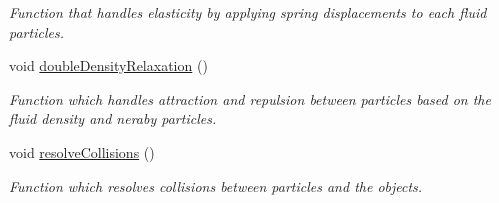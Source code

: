 \begin{DoxyCompactItemize}
\begin{DoxyCompactList}\small\item\em Function that handles elasticity by applying spring displacements to each fluid particles. \end{DoxyCompactList}\item 
void \hyperlink{classscene_a448751b5e9bad5d73901b765fc2b8a38}{double\+Density\+Relaxation} ()
\begin{DoxyCompactList}\small\item\em Function which handles attraction and repulsion between particles based on the fluid density and neraby particles. \end{DoxyCompactList}\item 
void \hyperlink{classscene_a18bf271763888eeb42d7155bdd2fc8b7}{resolve\+Collisions} ()
\begin{DoxyCompactList}\small\item\em Function which resolves collisions between particles and the objects. \end{DoxyCompactList}\end{DoxyCompactItemize}
